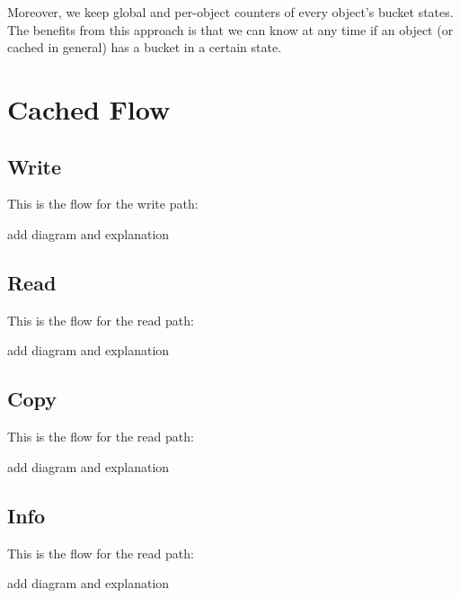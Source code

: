 Moreover, we keep global and per-object counters of every object's bucket 
states. The benefits from this approach is that we can know at any time if an 
object (or cached in general) has a bucket in a certain state.

\section{Cached Flow}\label{sec:cached-flow-design}

\subsection{Write}

This is the flow for the write path:

\fixme add diagram and explanation

\subsection{Read}

This is the flow for the read path:

\fixme add diagram and explanation

\subsection{Copy}

This is the flow for the read path:

\fixme add diagram and explanation

\subsection{Info}

This is the flow for the read path:

\fixme add diagram and explanation

